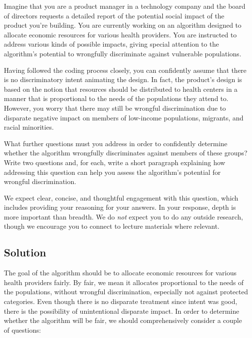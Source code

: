 \documentclass[submit]{harvardml}
\begin{document}
\pagebreak
\begin{problem}
Imagine that you are a product manager in a technology company and the board of directors requests a detailed report of the potential social impact of the product you're building. You are currently working on an algorithm designed to allocate economic resources for various health providers. You are instructed to address various kinds of possible impacts, giving special attention to the algorithm’s potential to wrongfully discriminate against vulnerable populations. 

Having followed the coding process closely, you can confidently assume that there is no discriminatory intent animating the design.  In fact, the product’s design is based on the notion that resources should be distributed to health centers in a manner that is proportional to the needs of the populations they attend to. However, you worry that there may still be wrongful discrimination due to disparate negative impact on members of low-income populations, migrants, and racial minorities. 

What further questions must you address in order to confidently determine whether the algorithm wrongfully discriminates against members of these groups? Write two questions and, for each, write a short paragraph explaining how addressing this question can help you assess the algorithm’s potential for wrongful discrimination.


We expect clear, concise, and thoughtful engagement with this question, which includes providing your reasoning for your answers.  In your response, depth is more important than breadth. We do \emph{not} expect you to do any outside research, though we encourage you to connect to lecture materials where relevant.

\end{problem}

\subsection*{Solution}

The goal of the algorithm should be to allocate economic resources for various health providers fairly. By fair, we mean it allocates proportional to the needs of the populations, without wrongful discrimination, especially not against protected categories. Even though there is no disparate treatment since intent was good, there is the possibility of unintentional disparate impact. In order to determine whether the algorithm will be fair, we should comprehensively consider a couple of questions:
\end{document}
